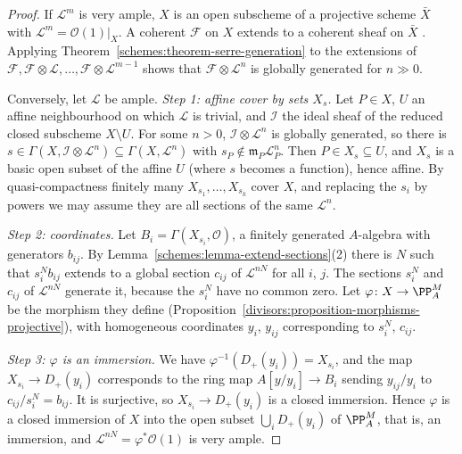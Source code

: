 \begin{proof}
If $\mathcal{L}^m$ is very ample, $X$ is an open subscheme of a projective scheme $\bar X$ with $\mathcal{L}^m = \mathcal{O}(1)|_X$. A coherent $\mathcal{F}$ on $X$ extends to a coherent sheaf
on $\bar X$ \cite[Exercise II.5.15]{hartshorne-ag}. Applying Theorem~\ref{schemes:theorem-serre-generation} to the extensions of
$\mathcal{F}, \mathcal{F} \otimes \mathcal{L}, \ldots, \mathcal{F} \otimes \mathcal{L}^{m-1}$ shows that $\mathcal{F} \otimes \mathcal{L}^n$ is globally generated for $n \gg 0$.

Conversely, let $\mathcal{L}$ be ample. \emph{Step 1: affine cover by sets $X_s$.} Let $P \in X$, $U$ an affine neighbourhood on which $\mathcal{L}$ is trivial, and $\mathcal{I}$
the ideal sheaf of the reduced closed subscheme $X \setminus U$. For some $n > 0$, $\mathcal{I} \otimes \mathcal{L}^n$ is globally generated, so there is
$s \in \Gamma(X, \mathcal{I} \otimes \mathcal{L}^n) \subseteq \Gamma(X, \mathcal{L}^n)$ with $s_P \notin \mathfrak{m}_P\mathcal{L}^n_P$. Then $P \in X_s \subseteq U$, and $X_s$ is a basic
open subset of the affine $U$ (where $s$ becomes a function), hence affine. By quasi-compactness finitely many $X_{s_1}, \ldots, X_{s_k}$ cover $X$, and replacing
the $s_i$ by powers we may assume they are all sections of the same $\mathcal{L}^n$.

\emph{Step 2: coordinates.} Let $B_i = \Gamma(X_{s_i}, \mathcal{O})$, a finitely generated $A$-algebra with generators $b_{ij}$. By
Lemma~\ref{schemes:lemma-extend-sections}(2) there is $N$ such that $s_i^Nb_{ij}$ extends to a global section $c_{ij}$ of $\mathcal{L}^{nN}$ for all $i$, $j$. The
sections $s_i^N$ and $c_{ij}$ of $\mathcal{L}^{nN}$ generate it, because the $s_i^N$ have no common zero. Let $\varphi \colon X \to \PP^M_A$ be the morphism they define
(Proposition~\ref{divisors:proposition-morphisms-projective}), with homogeneous coordinates $y_i$, $y_{ij}$ corresponding to $s_i^N$, $c_{ij}$.

\emph{Step 3: $\varphi$ is an immersion.} We have $\varphi^{-1}(D_+(y_i)) = X_{s_i}$, and the map $X_{s_i} \to D_+(y_i)$ corresponds to the ring map
$A[y/y_i] \to B_i$ sending $y_{ij}/y_i$ to $c_{ij}/s_i^N = b_{ij}$. It is surjective, so $X_{s_i} \to D_+(y_i)$ is a closed immersion. Hence $\varphi$ is a closed
immersion of $X$ into the open subset $\bigcup_iD_+(y_i)$ of $\PP^M_A$, that is, an immersion, and $\mathcal{L}^{nN} = \varphi^*\mathcal{O}(1)$ is very ample.
\end{proof}

